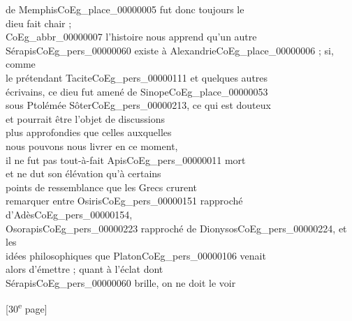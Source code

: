 \documentclass{book}
\begin{document}
{\begin{paracol}{2}
de Memphis\gls{CoEg_place_00000005} fut donc toujours le\\
dieu fait chair ;\\
\indent \gls{CoEg_abbr_00000007} l’histoire nous apprend qu’un autre\\
Sérapis\gls{CoEg_pers_00000060} existe à Alexandrie\gls{CoEg_place_00000006} ; si, comme\\
le prétendant Tacite\gls{CoEg_pers_00000111} et quelques autres\\
écrivains, ce dieu fut amené de Sinope\gls{CoEg_place_00000053}\\
sous Ptolémée Sôter\gls{CoEg_pers_00000213}, ce qui est douteux\\
et pourrait être l’objet de discussions\\
plus approfondies que celles auxquelles\\
nous pouvons nous livrer en ce moment,\\
il ne fut pas tout-à-fait Apis\gls{CoEg_pers_00000011} mort\\
et ne dut son élévation qu’à certains\\
points de ressemblance que les Grecs crurent\\
remarquer entre Osiris\gls{CoEg_pers_00000151} rapproché d’Adès\gls{CoEg_pers_00000154},\\
Osorapis\gls{CoEg_pers_00000223} rapproché de Dionysos\gls{CoEg_pers_00000224}, et les\\
idées philosophiques que Platon\gls{CoEg_pers_00000106} venait\\
alors d’émettre ; quant à l’éclat dont\\
Sérapis\gls{CoEg_pers_00000060} brille, on ne doit le voir
\end{paracol}

{\footnotesize\begin{center} {[30\textsuperscript{e} page]}\end{center}}

}
\end{document}
